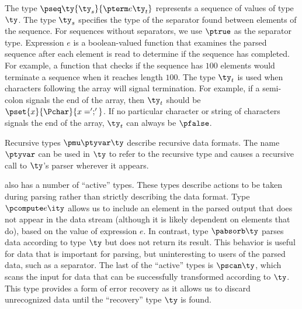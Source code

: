 The type $\pseq \ty {\ty_s} {\pterm e {\ty_t}}$ represents a sequence
of values of type $\ty$. The type $\ty_s$ specifies the type of
the separator found between elements of the sequence. For sequences
without separators, we use $\ptrue$ as the separator type. 
Expression $e$ is a boolean-valued function that examines the parsed
sequence after each element is read to determine
if the sequence has completed. For example, a function that
checks if the sequence has $100$ elements would
terminate a sequence when it reaches length $100$.  The type 
$\ty_t$ is used when characters following the array will signal termination.
For example, if a semi-colon signals the end of the array, then $\ty_t$ 
should be $\pset{x}{\Pchar}{x = ';'}$. If no particular character or 
string of characters
signals the end of the array, $\ty_t$ can always be $\pfalse$.

Recursive types $\pmu \ptyvar \ty$ describe recursive data formats.
The name $\ptyvar$ can be used in $\ty$ to refer to the recursive type
and causes a recursive call to $\ty$'s parser wherever it appears.

\ddc{} also has a number of ``active'' types.
These types describe actions to be taken during parsing
rather than strictly describing the data format. Type $\pcompute e
\ity$ allows us to include an element in the parsed output that
does not appear in the data stream (although it is likely dependent on
elements that do), based on the value of expression $e$.  In
contrast, type $\pabsorb \ty$ parses data according to type $\ty$
but does not return its result. This behavior is useful for data
that is important for parsing, but
uninteresting to users of the parsed data, such as a separator. The last of the ``active''
types is $\pscan \ty$, which scans the input for 
data that can be successfully transformed according to $\ty$. This type provides a form of error recovery
as it allows us to discard unrecognized data until the ``recovery'' type $\ty$ is found.

